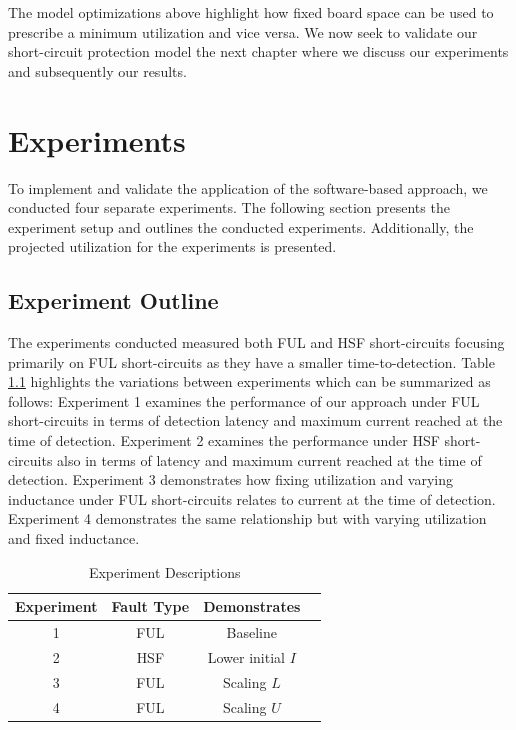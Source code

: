 \documentclass[11pt,oneside]{report}
\begin{document}
    The model optimizations above highlight how fixed board space can be used to prescribe a minimum utilization and vice versa. We now seek to validate our short-circuit protection model the next chapter where we discuss our experiments and subsequently our results.
    
    \chapter{Experiments}\label{chap:experiments}
    To implement and validate the application of the software-based approach, we conducted four separate experiments. The following section presents the experiment setup and outlines the conducted experiments. Additionally, the projected utilization for the experiments is presented.
    
    \section*{Experiment Outline}
    The experiments conducted measured both FUL and HSF short-circuits focusing primarily on FUL short-circuits as they have a smaller time-to-detection.
    Table \ref{tab:ExperimentDescriptions} highlights the variations between experiments which can be summarized as follows:
    Experiment 1 examines the performance of our approach under FUL short-circuits in terms of detection latency and maximum current reached at the time of detection. Experiment 2 examines the performance under HSF short-circuits also in terms of latency and maximum current reached at the time of detection.
    Experiment 3 demonstrates how fixing utilization and varying inductance under FUL short-circuits relates to current at the time of detection.
    Experiment 4 demonstrates the same relationship but with varying utilization and fixed inductance.
    \begin{table}[!h]
        \centering	
        \bgroup
        \def\arraystretch{1.00}%
        \begin{tabular}{| c | c | c | c |}
              \hline			
              Experiment & Fault Type & Demonstrates\\ \hline \hline \cline{1-3}
              1 & FUL & Baseline\\ \hline
              2 & HSF & Lower initial $I$\\ \hline
              3 & FUL & Scaling $L$\\ \hline
              4 & FUL & Scaling $U$\\ \hline  
        \end{tabular}
        \egroup
        \caption{Experiment Descriptions}
        \label{tab:ExperimentDescriptions}
    \end{table}
\end{document}
